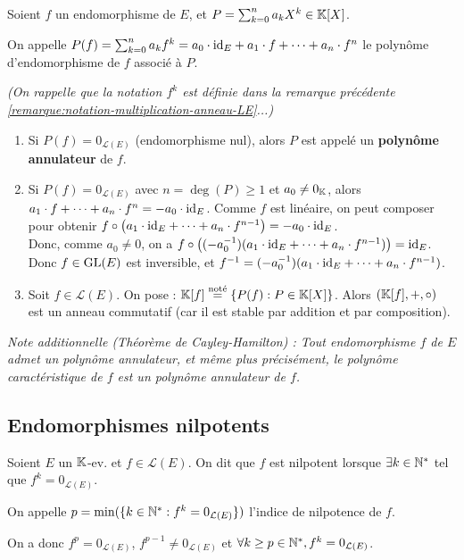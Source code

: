 \documentclass[12pt, a4paper]{report}
\begin{document}
\begin{remark}
    Soient $f$ un endomorphisme de $E$, et $P = \sum_{k=0}^n a_k X^k \in \mathbb{K}[X]$.

    On appelle $P(f) = \sum_{k=0}^n a_k f^k = a_0\cdot\mathrm{id}_E + a_1\cdot f + \dots + a_n\cdot f^n$ le polynôme d'endomorphisme de $f$ associé à $P$.

    \textit{(On rappelle que la notation $f^k$ est définie dans la remarque précédente \ref{remarque:notation-multiplication-anneau-LE}...)}

    \begin{enumerate}
        \item Si $P(f) = 0_{\mathcal L(E)}$ (endomorphisme nul), alors $P$ est appelé un \textbf{polynôme annulateur} de $f$.
        \item Si $P(f) = 0_{\mathcal L(E)}$ avec $n=\deg(P) \ge 1$ et $a_0 \ne 0_{\mathbb{K}}$, alors $a_1\cdot f + \dots + a_n\cdot f^n = -a_0\cdot\mathrm{id}_E$. Comme $f$ est linéaire, on peut composer pour obtenir $f\circ\left(a_1\cdot\mathrm{id}_E + \dots + a_n\cdot f^{n-1}\right)= -a_0\cdot\mathrm{id}_E$.\\Donc, comme $a_0 \ne 0$, on a $f\circ\left((-a_0^{-1})(a_1\cdot\mathrm{id}_E + \dots + a_n\cdot f^{n-1})\right) = \mathrm{id}_E$. Donc $f \in \mathrm{GL}(E)$ est inversible, et $f^{-1} = (-a_0^{-1})(a_1\cdot\mathrm{id}_E + \dots + a_n\cdot f^{n-1})$.
        \item Soit $f \in \mathcal L(E)$. On pose : $\mathbb{K}[f] \overset{\text{noté}}{=} \{P(f) : P \in \mathbb{K}[X]\}$. Alors $(\mathbb{K}[f],+,\circ)$ est un anneau commutatif (car il est stable par addition et par composition).
    \end{enumerate}

    \textit{Note additionnelle (Théorème de Cayley-Hamilton) : Tout endomorphisme $f$ de $E$ admet un polynôme annulateur, et même plus précisément, le polynôme caractéristique de $f$ est un polynôme annulateur de $f$.}
\end{remark}

\subsection{Endomorphismes nilpotents}

\begin{definition}
    Soient $E$ un $\mathbb{K}$-ev. et $f \in \mathcal L(E)$. On dit que $f$ est nilpotent lorsque $\exists k \in \mathbb{N}^*$ tel que $f^k = 0_{\mathcal L(E)}$.

    On appelle $p=\min(\{k \in \mathbb{N}^* : f^k = 0_{\mathcal L(E)}\})$ l'indice de nilpotence de $f$.

    On a donc $f^p = 0_{\mathcal L(E)}$, $f^{p-1} \neq 0_{\mathcal L(E)}$ et $\forall k \ge p \in \mathbb{N}^*, f^k = 0_{\mathcal L(E)}$. 
\end{definition}
\end{document}
